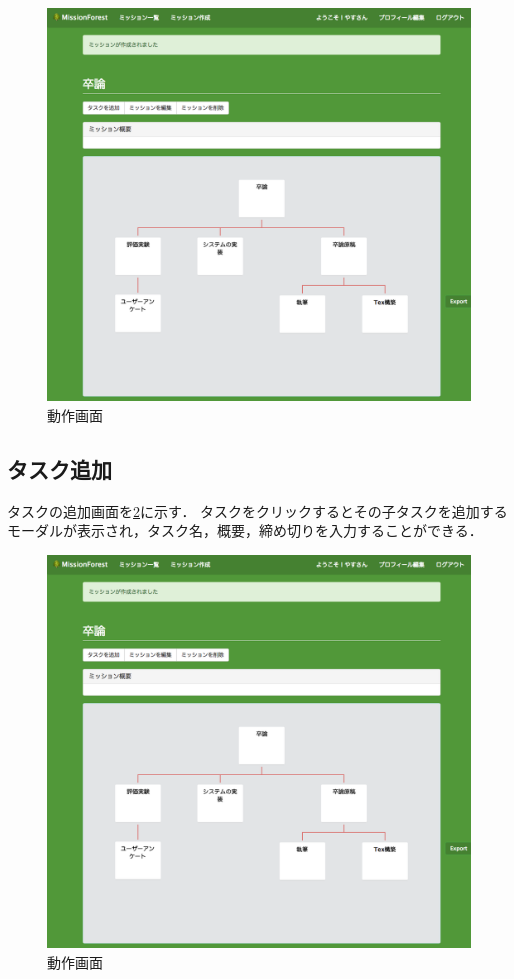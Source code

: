 \begin{figure}[t]
	\begin{center}
		\includegraphics[width=0.9\linewidth]{assets/img/interface_capture_detail.png}
		\caption{動作画面}
		\label{img:interface_capture_detail}
	\end{center}
\end{figure}

\subsection{タスク追加}
タスクの追加画面を\ref{img:interface_capture_add}に示す．
タスクをクリックするとその子タスクを追加するモーダルが表示され，タスク名，概要，締め切りを入力することができる．

\begin{figure}[t]
	\begin{center}
		\includegraphics[width=0.9\linewidth]{assets/img/interface_capture_add.png}
		\caption{動作画面}
		\label{img:interface_capture_add}
	\end{center}
\end{figure}

